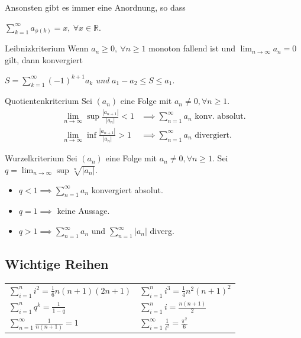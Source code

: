 \documentclass[a4paper,10pt]{article}
\def\limn{\lim_{n\to \infty}}
\def\sumk{\sum_{k=1}^\infty}
\def\R{\mathbb{R}}
\begin{document}
\noindent Ansonsten gibt es immer eine Anordnung, so dass \\
\centerline{$\sum_{k=1}^\infty a_{\phi(k)} = x, \ \forall x\in \R$.}

\begin{subbox}{Leibnizkriterium}
	Wenn $a_n \ge 0, \ \forall n \ge 1$ monoton fallend ist und $\limn a_n = 0$ gilt, dann konvergiert \\
	\centerline{$S = \sumk (-1)^{k+1} a_k$ \textit{und} $a_1 - a_2 \le S \le a_1$.}
\end{subbox}

\begin{mainbox}{Quotientenkriterium}
	Sei $(a_n)$ eine Folge mit $a_n \ne 0, \forall n \ge 1$.  
	\begin{align*}
		\textstyle \limn \sup \frac{|a_{n+1}|}{|a_n|} < 1 & \implies \textstyle \sum_{n=1}^\infty a_n \text{ konv. absolut.} \\ 
		\textstyle \limn \inf \frac{|a_{n+1}|}{|a_n|} > 1 & \implies \textstyle \sum_{n=1}^\infty a_n \text{ divergiert.}    
	\end{align*}
	
\end{mainbox}

\begin{mainbox}{Wurzelkriterium}
	Sei $(a_n)$ eine Folge mit $a_n \ne 0, \forall n \ge 1$. Sei $q = \limn \sup \sqrt[n]{|a_n|}$. 
	\begin{itemize}
		\item $q < 1 \implies \sum_{n=1}^\infty a_n$ konvergiert absolut.
		\item $q = 1 \implies$ keine Aussage.
		\item $q > 1 \implies \sum_{n=1}^\infty a_n$ und $\sum_{n=1}^\infty |a_n|$ diverg.
	\end{itemize}
\end{mainbox}

\subsection{Wichtige Reihen}
\begin{table}[H]
	\begin{tabular}{ll}
		$\displaystyle\sum_{i=1}^n i^2 = \frac{1}{6}n(n+1)(2n+1)$ & $\displaystyle\sum_{i=1}^n i^3 = \frac{1}{4}n^2(n+1)^2$          \\
		$\displaystyle\sum_{i=1}^n q^k = \frac{1}{1-q}$           & $\displaystyle\sum_{i=1}^n i = \frac{n(n+1)}{2}$                 \\
		$\displaystyle\sum_{n=1}^\infty \frac{1}{n(n+1)} = 1$     & $\displaystyle\sum_{i=1}^\infty \frac{1}{i^2} = \frac{\pi^2}{6}$ 
	\end{tabular}
\end{table}
\end{document}
